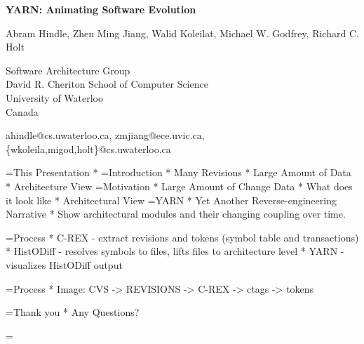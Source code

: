 \documentclass[titlepage,usenames,a4,landscape,semhelv]{seminar}
\title{\large \gettitleproper}
\author{
\names \\ 
{\small Software Architecture Group }\\
\small David R. Cheriton School of Computer Science\\
\small University of Waterloo\\
\small Canada\\
ahindle@cs.uwaterloo.ca, zmjiang@ece.uvic.ca, \{wkoleila,migod,holt\}@cs.uwaterloo.ca
}
\newcommand{\gettitle}{
YARN: Animating Software Evolution
}
\newcommand{\names}{Abram Hindle, Zhen Ming Jiang, Walid Koleilat, Michael W. Godfrey, Richard C. Holt}
\begin{document}
\pagestyle{fancy} %
\begin{slide}

\begin{center}
{\bf \LARGE \gettitle }

{\names } 

{\small Software Architecture Group }\\[-.5em]
{\small David R. Cheriton School of Computer Science}\\[-.5em]
{\small University of Waterloo}\\[-.5em]
{\small Canada}

ahindle@cs.uwaterloo.ca, zmjiang@ece.uvic.ca, \{wkoleila,migod,holt\}@cs.uwaterloo.ca


\end{center}

=This Presentation
* 
=Introduction
* Many Revisions
* Large Amount of Data
* Architecture View
=Motivation
* Large Amount of Change Data
* What does it look like
* Architectural View
=YARN
* Yet Another Reverse-engineering Narrative
* Show architectural modules and their changing coupling over time.

=Process
* C-REX - extract revisions and tokens (symbol table and transactions)
* HistODiff - resolves symbols to files, lifts files to architecture level
* YARN - visualizes HistODiff output

=Process
* Image:
  CVS -> REVISIONS -> C-REX -> ctags -> tokens



=Thank you
* Any Questions?


=
%
%

\end{slide}
\end{document}
